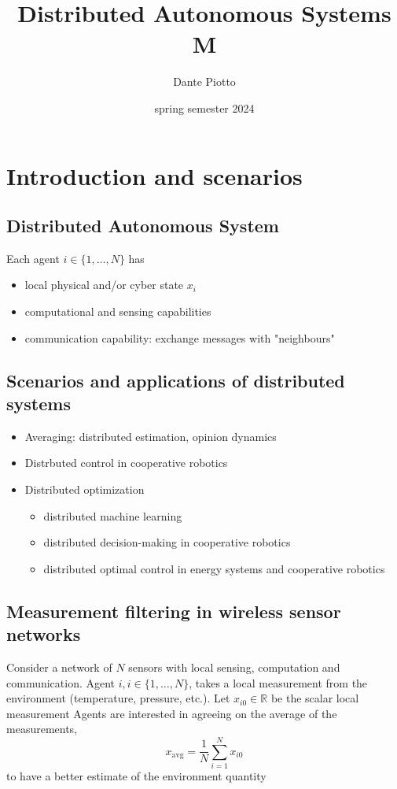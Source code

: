 \documentclass{book}
\title{Distributed Autonomous Systems M}
\author{Dante Piotto}
\date{spring semester 2024}
\newcommand{\R}{\mathbb{R}}
\theoremstyle{theoremv2}
\theoremstyle{defv2}
\theoremstyle{remark}
\theoremstyle{remark}
\theoremstyle{definition}
\theoremstyle{definition}
\begin{document}
\maketitle
\tableofcontents

\chapter{Introduction and scenarios}
\section{Distributed Autonomous System}
Each agent $i\in\{1,\dots,N\}$ has 
\begin{itemize}
    \item local physical and/or cyber state $x_i$
    \item computational and sensing capabilities
    \item communication capability: exchange messages with "neighbours"
\end{itemize}


\section{Scenarios and applications of distributed systems}
\begin{itemize}
    \item Averaging: distributed estimation, opinion dynamics
    \item Distrbuted control in cooperative robotics
    \item Distributed optimization 
        \begin{itemize}
            \item distributed machine learning
            \item distributed decision-making in cooperative robotics
            \item distributed optimal control in energy systems and cooperative robotics
        \end{itemize}
\end{itemize}


\section{Measurement filtering in wireless sensor networks}
Consider a network of $N$ sensors with local sensing, computation and communication. Agent $i,i\in\{1,\dots,N\}$, takes a local measurement from the environment (temperature, pressure, etc.). Let $x_{i0}\in\R$ be the scalar local measurement
Agents are interested in agreeing on the average of the measurements, 
\[
    x_{\text{avg}}=\displaystyle\frac{1}{N}\displaystyle\sum_{i=1}^{N}x_{i0}
\]
to have a better estimate of the environment quantity
\end{document}
